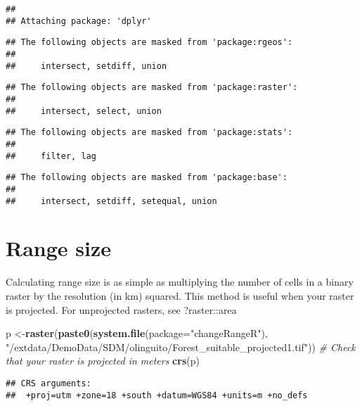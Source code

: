 \documentclass[
]{article}
\newenvironment{Shaded}{\begin{snugshade}}{\end{snugshade}}
\newcommand{\CommentTok}[1]{\textcolor[rgb]{0.56,0.35,0.01}{\textit{#1}}}
\newcommand{\DataTypeTok}[1]{\textcolor[rgb]{0.13,0.29,0.53}{#1}}
\newcommand{\KeywordTok}[1]{\textcolor[rgb]{0.13,0.29,0.53}{\textbf{#1}}}
\newcommand{\NormalTok}[1]{#1}
\newcommand{\StringTok}[1]{\textcolor[rgb]{0.31,0.60,0.02}{#1}}
\begin{document}
\begin{verbatim}
## 
## Attaching package: 'dplyr'
\end{verbatim}

\begin{verbatim}
## The following objects are masked from 'package:rgeos':
## 
##     intersect, setdiff, union
\end{verbatim}

\begin{verbatim}
## The following objects are masked from 'package:raster':
## 
##     intersect, select, union
\end{verbatim}

\begin{verbatim}
## The following objects are masked from 'package:stats':
## 
##     filter, lag
\end{verbatim}

\begin{verbatim}
## The following objects are masked from 'package:base':
## 
##     intersect, setdiff, setequal, union
\end{verbatim}

\hypertarget{range-size}{%
\section{Range size}\label{range-size}}

Calculating range size is as simple as multiplying the number of cells
in a binary raster by the resolution (in km) squared. This method is
useful when your raster is projected. For unprojected rasters, see
?raster::area

\begin{Shaded}
\begin{Highlighting}[]
\NormalTok{p <-}\KeywordTok{raster}\NormalTok{(}\KeywordTok{paste0}\NormalTok{(}\KeywordTok{system.file}\NormalTok{(}\DataTypeTok{package=}\StringTok{"changeRangeR"}\NormalTok{), }\StringTok{"/extdata/DemoData/SDM/olinguito/Forest_suitable_projected1.tif"}\NormalTok{))}
\CommentTok{# Check that your raster is projected in meters}
\KeywordTok{crs}\NormalTok{(p)}
\end{Highlighting}
\end{Shaded}

\begin{verbatim}
## CRS arguments:
##  +proj=utm +zone=18 +south +datum=WGS84 +units=m +no_defs
\end{verbatim}
\end{document}
